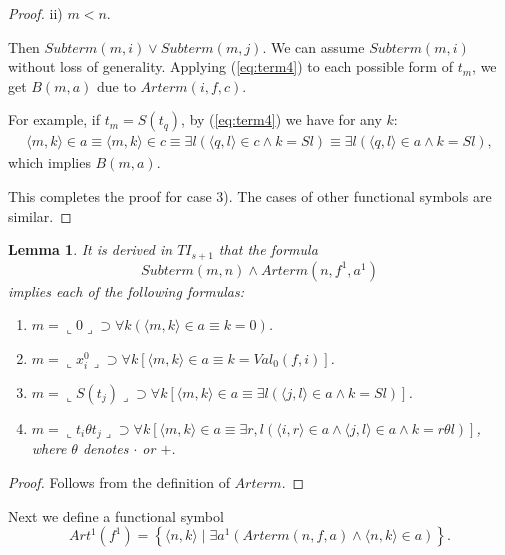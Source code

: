 \documentclass{asl}
\newtheorem{lemma}{Lemma}[section]
\theoremstyle{definition}
\begin{document}
\begin{proof}
ii) $m<n$.

Then $Subterm(m,i)\vee Subterm(m,j)$. We can assume $Subterm(m,i)$ without loss of generality. Applying (\ref{eq:term4}) to each possible form of $t_m$, we get $B(m,a)$ due to $Arterm(i,f,c)$. 

For example, if $t_m=S(t_q)$, by (\ref{eq:term4}) we have for any $k$:
\begin{multline*}
\langle m,k\rangle\in a\equiv\langle m,k\rangle\in c\equiv\exists l\left(\langle q,l\rangle\in c\wedge  k=Sl\right)
\equiv\exists l\left(\langle q,l\rangle\in a\wedge k=Sl\right),
\end{multline*}
which implies $B(m,a)$.

This completes the proof for case 3). The cases of other functional symbols are similar.
\end{proof}

\begin{lemma}
It is derived in $TI_{s+1}$ that the formula 
\[Subterm(m,n)\wedge Arterm(n,f^1,a^1)\]
implies each of the following formulas:
\begin{enumerate}
\item $m=\llcorner 0\lrcorner\supset\forall k\left(\langle m,k\rangle\in a \equiv k=0\right)$.
\medskip
\item
$m=\llcorner x_i^0\lrcorner \supset\forall k\left[\langle m,k\rangle\in a \equiv k= Val_0(f,i)\right]$.
\medskip
\item
$m=\llcorner S(t_j)\lrcorner
\supset\forall k\left[\langle m,k\rangle\in a \equiv 
\exists l\left(\langle j,l\rangle\in a\wedge k=Sl  \right)\right]$.
\medskip
\item
$m=\llcorner t_i\theta t_j  \lrcorner 
\supset\forall k\left[\langle m,k\rangle\in a 
\equiv \exists r,l\left(\langle i,r\rangle\in a\wedge \langle j,l\rangle\in a\wedge k=r\theta l\right)\right]$,
\\
where $\theta$ denotes $\cdot$ or $+$.
\end{enumerate}
\label{lemma:term3}
\end{lemma}
\begin{proof}
Follows from the definition of $Arterm$.
\end{proof}

Next we define a functional symbol 
\[Art^1(f^1)=\left\lbrace \langle n,k\rangle \mid \exists a^1(Arterm(n,f,a)\wedge \langle n,k\rangle\in a)\right\rbrace.\]
\end{document}
